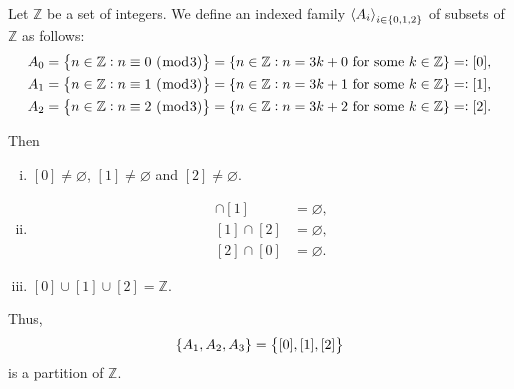 \documentclass[11pt,openany]{article}
\begin{document}
\begin{example*}
	Let $\mathbb{Z}$ be a set of integers. We define an indexed family $\left\langle A_i \right\rangle_{i\in\set{0,1,2}}$ of subsets of $\mathbb{Z}$ as follows: \begin{align*}
		A_0=\set{n\in\mathbb{Z}: n\equiv 0\ (\bmod 3)}=\set{n\in\mathbb{Z}:n=3k+0\ \text{for some}\ k\in\mathbb{Z}}=:[0],\\
		A_1=\set{n\in\mathbb{Z}: n\equiv 1\ (\bmod 3)}=\set{n\in\mathbb{Z}:n=3k+1\ \text{for some}\ k\in\mathbb{Z}}=:[1],\\
		A_2=\set{n\in\mathbb{Z}: n\equiv 2\ (\bmod 3)}=\set{n\in\mathbb{Z}:n=3k+2\ \text{for some}\ k\in\mathbb{Z}}=:[2].
	\end{align*}
	\begin{minipage}{.5\textwidth}
		Then \begin{enumerate}[(i)]
			\item $[0]\neq\varnothing$, $[1]\neq\varnothing$ and $[2]\neq\varnothing$.
			\item \begin{align*}
				[0]\cap[1] &= \varnothing, \\
				[1]\cap[2] &= \varnothing, \\
				[2]\cap[0] &= \varnothing.
			\end{align*}
			\item $[0]\cup [1]\cup [2]=\mathbb{Z}$.
		\end{enumerate} Thus, \[
		\set{A_1,A_2,A_3}=\set{[0],[1],[2]}
		\]is a partition of $\mathbb{Z}$.
	\end{minipage}
	\begin{minipage}{.5\textwidth}
	\end{minipage}
\end{example*}
\end{document}
